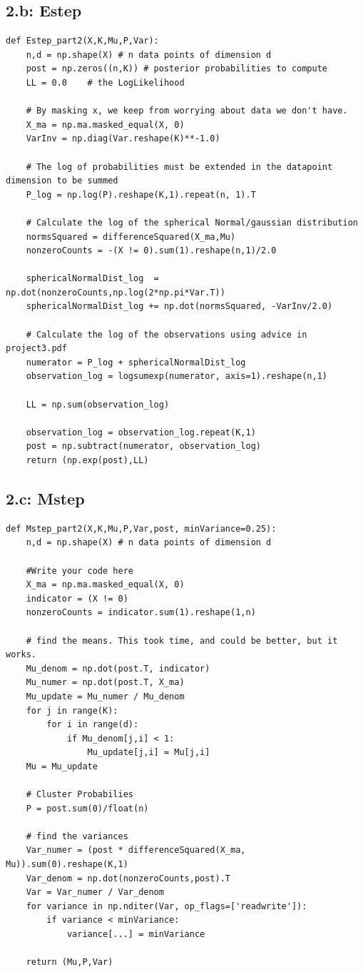 \documentclass{article}
\begin{document}
\subsection*{2.b: Estep}
\begin{lstlisting}
def Estep_part2(X,K,Mu,P,Var):
    n,d = np.shape(X) # n data points of dimension d
    post = np.zeros((n,K)) # posterior probabilities to compute
    LL = 0.0    # the LogLikelihood
    
    # By masking x, we keep from worrying about data we don't have.
    X_ma = np.ma.masked_equal(X, 0)
    VarInv = np.diag(Var.reshape(K)**-1.0)

    # The log of probabilities must be extended in the datapoint dimension to be summed
    P_log = np.log(P).reshape(K,1).repeat(n, 1).T
    
    # Calculate the log of the spherical Normal/gaussian distribution
    normsSquared = differenceSquared(X_ma,Mu)
    nonzeroCounts = -(X != 0).sum(1).reshape(n,1)/2.0

    sphericalNormalDist_log  = np.dot(nonzeroCounts,np.log(2*np.pi*Var.T))
    sphericalNormalDist_log += np.dot(normsSquared, -VarInv/2.0)

    # Calculate the log of the observations using advice in project3.pdf
    numerator = P_log + sphericalNormalDist_log
    observation_log = logsumexp(numerator, axis=1).reshape(n,1)

    LL = np.sum(observation_log)
    
    observation_log = observation_log.repeat(K,1)
    post = np.subtract(numerator, observation_log)
    return (np.exp(post),LL)
\end{lstlisting}
\subsection*{2.c: Mstep}
\begin{lstlisting}
def Mstep_part2(X,K,Mu,P,Var,post, minVariance=0.25):
    n,d = np.shape(X) # n data points of dimension d
    
    #Write your code here
    X_ma = np.ma.masked_equal(X, 0)
    indicator = (X != 0)
    nonzeroCounts = indicator.sum(1).reshape(1,n)

    # find the means. This took time, and could be better, but it works. 
    Mu_denom = np.dot(post.T, indicator)
    Mu_numer = np.dot(post.T, X_ma)
    Mu_update = Mu_numer / Mu_denom
    for j in range(K):
        for i in range(d):
            if Mu_denom[j,i] < 1:
                Mu_update[j,i] = Mu[j,i]
    Mu = Mu_update
    
    # Cluster Probabilies
    P = post.sum(0)/float(n)

    # find the variances
    Var_numer = (post * differenceSquared(X_ma, Mu)).sum(0).reshape(K,1)
    Var_denom = np.dot(nonzeroCounts,post).T
    Var = Var_numer / Var_denom
    for variance in np.nditer(Var, op_flags=['readwrite']):
        if variance < minVariance:
            variance[...] = minVariance
    
    return (Mu,P,Var)
\end{lstlisting}
\end{document}
